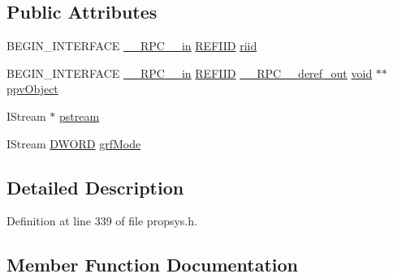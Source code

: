 \subsection*{Public Attributes}
\begin{DoxyCompactItemize}
\item 
B\+E\+G\+I\+N\+\_\+\+I\+N\+T\+E\+R\+F\+A\+CE \hyperlink{rpcsal_8h_a20b7f6da600a05c8b541659f14f7f0e6}{\+\_\+\+\_\+\+R\+P\+C\+\_\+\+\_\+in} \hyperlink{px__win__ds_8c_a80ec49c8ae61e234197d5071d2df497d}{R\+E\+F\+I\+ID} \hyperlink{struct_i_initialize_with_stream_vtbl_a66afb9fdc5c7f1b5e6c7c5da707901fe}{riid}
\item 
B\+E\+G\+I\+N\+\_\+\+I\+N\+T\+E\+R\+F\+A\+CE \hyperlink{rpcsal_8h_a20b7f6da600a05c8b541659f14f7f0e6}{\+\_\+\+\_\+\+R\+P\+C\+\_\+\+\_\+in} \hyperlink{px__win__ds_8c_a80ec49c8ae61e234197d5071d2df497d}{R\+E\+F\+I\+ID} \hyperlink{rpcsal_8h_a23bc188526f10656f9c79d950f6c3192}{\+\_\+\+\_\+\+R\+P\+C\+\_\+\+\_\+deref\+\_\+out} \hyperlink{sound_8c_ae35f5844602719cf66324f4de2a658b3}{void} $\ast$$\ast$ \hyperlink{struct_i_initialize_with_stream_vtbl_a5cf609b139ce3bbba4bf7ce7719d9569}{ppv\+Object}
\item 
I\+Stream $\ast$ \hyperlink{struct_i_initialize_with_stream_vtbl_a3f9254ccbe809c949145e7166ddb7304}{pstream}
\item 
I\+Stream \hyperlink{mapinls_8h_ad342ac907eb044443153a22f964bf0af}{D\+W\+O\+RD} \hyperlink{struct_i_initialize_with_stream_vtbl_a2a14f3f8dc6659b0786d9a966921a44a}{grf\+Mode}
\end{DoxyCompactItemize}


\subsection{Detailed Description}


Definition at line 339 of file propsys.\+h.



\subsection{Member Function Documentation}
